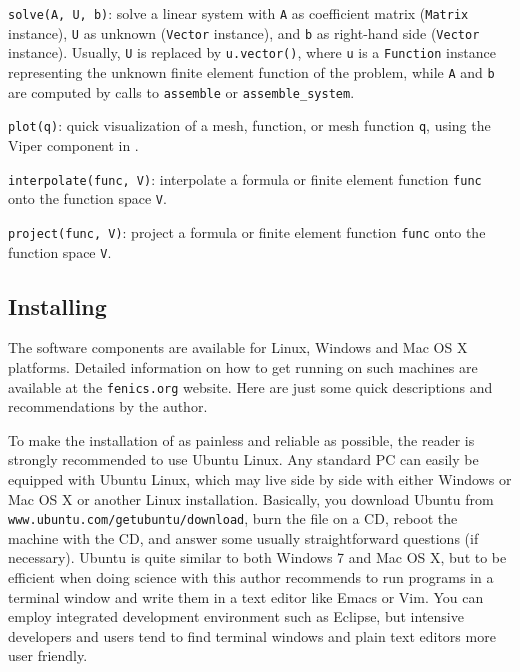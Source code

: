 {\fontsize{12pt}{12pt}\texttt{solve(A, U, b)}}: solve a linear system with {\fontsize{12pt}{12pt}\texttt{A}} as coefficient
matrix ({\fontsize{12pt}{12pt}\texttt{Matrix}} instance), {\fontsize{12pt}{12pt}\texttt{U}} as unknown ({\fontsize{12pt}{12pt}\texttt{Vector}} instance),
and {\fontsize{12pt}{12pt}\texttt{b}} as right-hand side ({\fontsize{12pt}{12pt}\texttt{Vector}} instance).
Usually, {\fontsize{12pt}{12pt}\texttt{U}} is replaced by {\fontsize{12pt}{12pt}\texttt{u.vector()}}, where
{\fontsize{12pt}{12pt}\texttt{u}} is a {\fontsize{12pt}{12pt}\texttt{Function}} instance representing the unknown finite
element function of the problem, while
{\fontsize{12pt}{12pt}\texttt{A}} and {\fontsize{12pt}{12pt}\texttt{b}} are computed by calls to {\fontsize{12pt}{12pt}\texttt{assemble}}
or {\fontsize{12pt}{12pt}\verb!assemble_system!}.\gln

{\fontsize{12pt}{12pt}\texttt{plot(q)}}: quick visualization of a mesh, function, or mesh function
{\fontsize{12pt}{12pt}\texttt{q}}, using the Viper component in \fenics{}.\gln

{\fontsize{12pt}{12pt}\texttt{interpolate(func, V)}}: interpolate a formula or finite
element function {\fontsize{12pt}{12pt}\texttt{func}}
onto the function space {\fontsize{12pt}{12pt}\texttt{V}}.\gln

{\fontsize{12pt}{12pt}\texttt{project(func, V)}}: project a formula or finite element function {\fontsize{12pt}{12pt}\texttt{func}}
onto the function space {\fontsize{12pt}{12pt}\texttt{V}}.\gln



\subsection{Installing \fenics}
\label{langtangen:app:install}

The \fenics{} software components are available for Linux, Windows and Mac OS
X platforms. Detailed information on how to get \fenics{} running on such
machines are available at the {\fontsize{12pt}{12pt}\texttt{fenics.org}} website.
Here are just some quick descriptions and recommendations by the author.

To make the installation of \fenics{} as painless and reliable as
possible, the reader is strongly recommended to use Ubuntu Linux. Any
standard PC can easily be equipped with Ubuntu Linux, which may live
side by side with either Windows or Mac OS X or another Linux
installation.  Basically, you download
Ubuntu from {\fontsize{12pt}{12pt}\verb!www.ubuntu.com/getubuntu/download!}, burn the file on
a CD, reboot the machine with the CD, and answer some usually
straightforward questions (if necessary). Ubuntu is quite similar to
both Windows 7 and Mac OS X, but to be efficient when doing science
with \fenics{} this author recommends to run programs in a terminal
window and write them in a text editor like Emacs or Vim. You can
employ integrated development environment such as Eclipse, but
intensive \fenics{} developers and users tend to find terminal windows
and plain text editors more user friendly.

